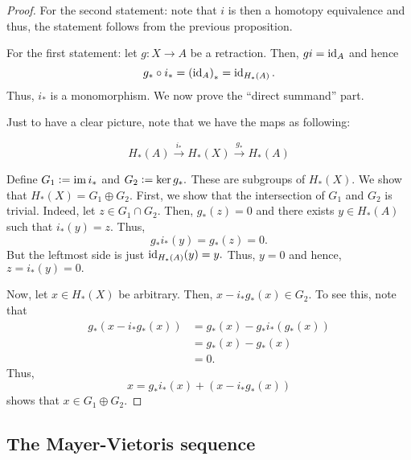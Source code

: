 \documentclass[12pt]{article}
\begin{document}
\begin{proof} 
	For the second statement: note that $i$ is then a homotopy equivalence and thus, the statement follows from the previous proposition.

	For the first statement: let $g:X \to A$ be a retraction. Then, $gi = \operatorname{id}_A$ and hence
	\begin{equation*} 
		g_*\circ i_* = \left(\operatorname{id}_A\right)_* = \operatorname{id}_{H_*(A)}.
	\end{equation*}
	Thus, $i_*$ is a monomorphism. We now prove the ``direct summand'' part.

	Just to have a clear picture, note that we have the maps as following:

	\begin{equation*} 
		H_*(A) \overset{i_*}{\longrightarrow} H_*(X) \overset{g_*}{\longrightarrow} H_*(A)
	\end{equation*}

	Define $G_1 \vcentcolon= \operatorname{im} i_*$ and $G_2 \vcentcolon= \ker g_*.$ These are subgroups of $H_*(X).$ We show that $H_*(X) = G_1 \oplus G_2.$ First, we show that the intersection of $G_1$ and $G_2$ is trivial. Indeed, let $z \in G_1 \cap G_2.$ Then, $g_*(z) = 0$ and there exists $y \in H_*(A)$ such that $i_*(y) = z.$ Thus,
	\begin{equation*} 
		g_*i_*(y) = g_*(z) = 0.
	\end{equation*}
	But the leftmost side is just $\operatorname{id}_{H_*(A)}(y) = y.$ Thus, $y = 0$ and hence, $z = i_*(y) = 0.$

	Now, let $x \in H_*(X)$ be arbitrary. Then, $x - i_*g_*(x) \in G_2.$ To see this, note that
	\begin{align*} 
		g_*(x - i_*g_*(x)) &= g_*(x) - g_*i_*(g_*(x))\\
		&= g_*(x) - g_*(x)\\
		&= 0.
	\end{align*}
	Thus,
	\begin{equation*} 
		x = g_*i_*(x) + (x - i_*g_*(x))
	\end{equation*}
	shows that $x \in G_1 \oplus G_2.$
\end{proof}

\subsection{The Mayer-Vietoris sequence}
\end{document}
